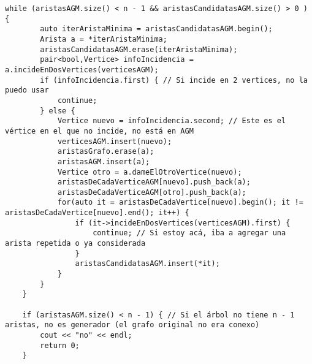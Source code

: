 \begin{lstlisting}[frame=single]
    while (aristasAGM.size() < n - 1 && aristasCandidatasAGM.size() > 0 ) {
        auto iterAristaMinima = aristasCandidatasAGM.begin();
        Arista a = *iterAristaMinima;
        aristasCandidatasAGM.erase(iterAristaMinima);
        pair<bool,Vertice> infoIncidencia = a.incideEnDosVertices(verticesAGM);
        if (infoIncidencia.first) { // Si incide en 2 vertices, no la puedo usar
            continue;
        } else {
            Vertice nuevo = infoIncidencia.second; // Este es el vértice en el que no incide, no está en AGM
            verticesAGM.insert(nuevo); 
            aristasGrafo.erase(a);
            aristasAGM.insert(a); 
            Vertice otro = a.dameElOtroVertice(nuevo);
            aristasDeCadaVerticeAGM[nuevo].push_back(a); 
            aristasDeCadaVerticeAGM[otro].push_back(a);
            for(auto it = aristasDeCadaVertice[nuevo].begin(); it != aristasDeCadaVertice[nuevo].end(); it++) {
                if (it->incideEnDosVertices(verticesAGM).first) {
                    continue; // Si estoy acá, iba a agregar una arista repetida o ya considerada
                }
                aristasCandidatasAGM.insert(*it);
            }
        }
    }
    
    if (aristasAGM.size() < n - 1) { // Si el árbol no tiene n - 1 aristas, no es generador (el grafo original no era conexo)
        cout << "no" << endl;
        return 0;
    }
    

\end{lstlisting}
